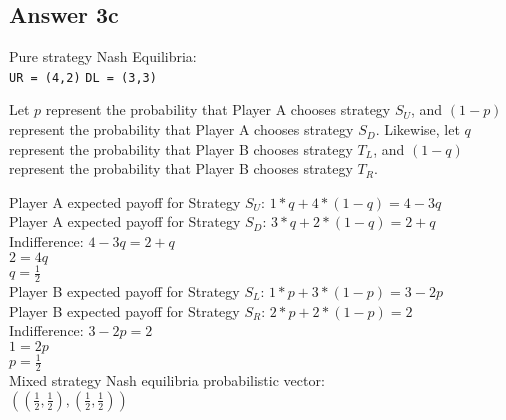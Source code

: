 \documentclass[twoside]{article}
\begin{document}
\subsection{Answer 3c}

Pure strategy Nash Equilibria: \\
\texttt{UR = (4,2)}
\texttt{DL = (3,3)}

Let $p$ represent the probability that Player A chooses strategy $S_{U}$, and $(1-p)$ represent the probability that Player A chooses strategy $S_{D}$. Likewise, let $q$ represent the probability that Player B chooses strategy $T_{L}$, and $(1-q)$ represent the probability that Player B chooses strategy $T_{R}$.

Player A expected payoff for Strategy $S_{U}$: $1*q + 4*(1-q) = 4 - 3q$ \\
Player A expected payoff for Strategy $S_{D}$: $3*q + 2*(1-q) = 2 + q$ \\
Indifference: 
$4 - 3q = 2 + q$ \\
$2 = 4q$ \\
$q = \frac{1}{2}$ \\

Player B expected payoff for Strategy $S_{L}$: $1*p + 3*(1-p) = 3 - 2p$ \\
Player B expected payoff for Strategy $S_{R}$: $2*p + 2*(1-p) = 2$ \\
Indifference: 
$3 - 2p = 2$ \\
$1 = 2p$ \\
$p = \frac{1}{2}$ \\

Mixed strategy Nash equilibria probabilistic vector: \\
$((\frac{1}{2}, \frac{1}{2}), (\frac{1}{2}, \frac{1}{2}))$
\end{document}
